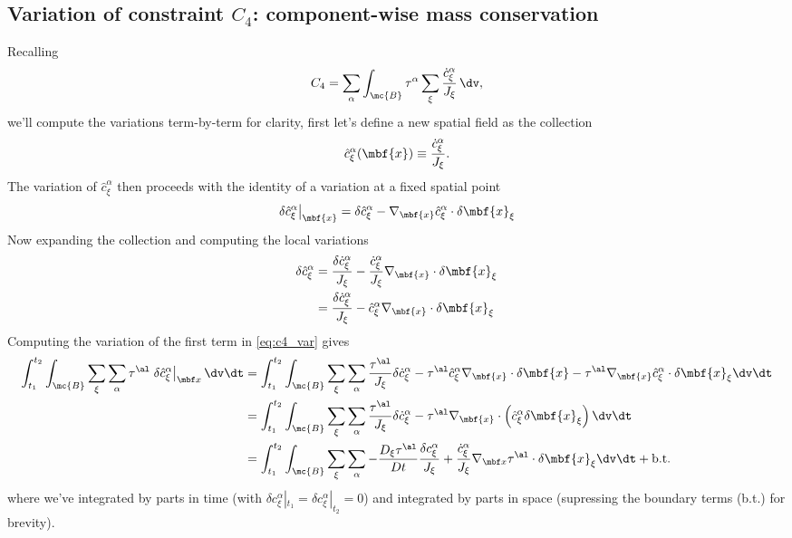 \subsection{Variation of constraint $C_4$: component-wise mass conservation}
\label{sec:var_C4_app}

Recalling
\begin{equation}
  C_4 = \sum_\alpha \int_{\mc{B}} \tau^\alpha \sum_\xi \frac{\dot{c}^\alpha_\xi}{J_\xi}  \,\dv,
  \label{eq:c4_var}
\end{equation}
%
we'll compute the variations term-by-term for clarity, first let's define a new spatial field as the collection
\[
  \hat{c}^\alpha_\xi(\mbf{x}) \equiv \frac{\dot{c}^\alpha_\xi}{J_\xi}.
\]
%
The variation of $\hat{c}^\alpha_\xi$ then proceeds with the identity of a variation at a fixed spatial point
%
\[
  \left.\delta\hat{c}^\alpha_\xi\right\vert_{\mbf{x}} = \delta\hat{c}^\alpha_\xi - \nabla_{\mbf{x}} \hat{c}^\alpha_\xi \cdot \delta\mbf{x}_\xi
\]
%
Now expanding the collection and computing the local variations
\begin{align}
  \delta\hat{c}^\alpha_\xi &=  \frac{\delta \dot{c}^\alpha_\xi}{J_\xi}  - \frac{\dot{c}^\alpha_\xi }{J_\xi} \nabla_\mbf{x} \cdot \delta \mbf{x}_\xi \notag \\
   &=  \frac{\delta \dot{c}^\alpha_\xi}{J_\xi}  - \hat{c}^\alpha_\xi \nabla_\mbf{x} \cdot \delta \mbf{x}_\xi \notag \\
\end{align}
%
Computing the variation of the first term in \eqref{eq:c4_var} gives
\begin{align}
  \int_{t_1}^{t_2} \int_{\mc{B}} \sum_\xi \sum_\alpha \tau^\al \left.\delta\hat{c}^\alpha_\xi \right\vert_{\mbf x} \dv \dt 
  &=  \int_{t_1}^{t_2} \int_{\mc{B}} \sum_\xi \sum_\alpha  \frac{\tau^\al}{J_\xi} \delta \dot{c}^\alpha_\xi - \tau^\al \hat{c}^\alpha_\xi \nabla_\mbf{x} \cdot \delta \mbf{x} - \tau^\al \nabla_{\mbf{x}} \hat{c}^\alpha_\xi \cdot \delta\mbf{x}_\xi \dv \dt \notag \\
   &= \int_{t_1}^{t_2} \int_{\mc{B}} \sum_\xi \sum_\alpha \frac{\tau^\al }{J_\xi} \delta \dot{c}^\alpha_\xi  - \tau^\al \nabla_\mbf{x} \cdot \left(\hat{c}^\alpha_\xi \delta \mbf{x}_\xi \right) \dv \dt \notag \\
   &= \int_{t_1}^{t_2} \int_{\mc{B}} \sum_\xi \sum_\alpha  - \frac{D_\xi \tau^\al}{Dt}\frac{\delta c^\alpha_\xi}{J_\xi}  + \frac{\dot{c}^\alpha_\xi}{J_\xi} \nabla_{\mbf x} \tau^\al \cdot  \delta \mbf{x}_\xi  \dv \dt + \text{b.t.}
   \label{eq:c4_term1}
\end{align}
%
where we've integrated by parts in time (with $\delta c_\xi^\alpha|_{t_1} = \delta c_\xi^\alpha|_{t_2} = 0$) and integrated by parts in space (supressing the boundary terms (b.t.) for brevity).  


